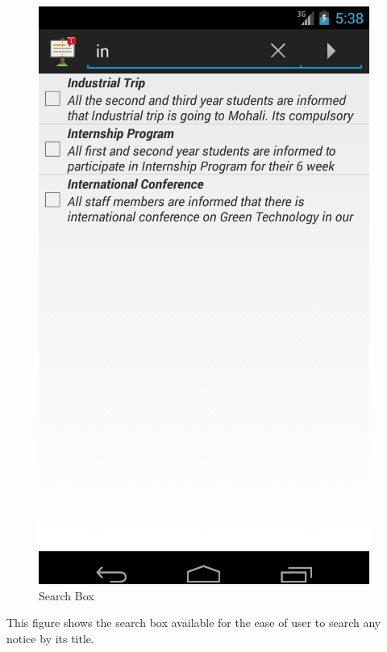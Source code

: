 \begin{figure}[H]
\centering \includegraphics[scale=0.7]{image/search.png}
\caption{Search Box}
\end{figure}

This figure shows the search box available for the ease of user to search any notice by its title.


